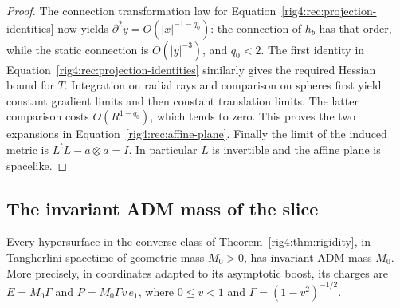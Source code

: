 \begin{proof}
The connection transformation law for
Equation~\eqref{rig4:rec:projection-identities} now yields
$\partial^2y=O(|x|^{-1-q_0})$: the connection of $h_b$ has that order, while
the static connection is $O(|y|^{-3})$, and $q_0<2$.  The first identity in
Equation~\eqref{rig4:rec:projection-identities} similarly gives the required
Hessian bound for $T$.  Integration on radial rays and comparison on spheres
first yield constant gradient limits and then constant translation limits.
The latter comparison costs $O(R^{1-q_0})$, which tends to zero.  This proves
the two expansions in Equation~\eqref{rig4:rec:affine-plane}.  Finally the limit
of the induced metric is $L^tL-a\otimes a=I$.  In particular $L$ is
invertible and the affine plane is spacelike.
\end{proof}

\subsection{The invariant ADM mass of the slice}

\begin{proposition}
\label{rig4:rec:converse-mass}
Every hypersurface in the converse class of Theorem~\ref{rig4:thm:rigidity}, in
Tangherlini spacetime of geometric mass $M_0>0$, has invariant ADM mass $M_0$.
More precisely, in coordinates adapted to its asymptotic boost, its charges
are $E=M_0\Gamma$ and $P=M_0\Gamma v\,e_1$, where
$0\leq v<1$ and $\Gamma=(1-v^2)^{-1/2}$.
\end{proposition}

